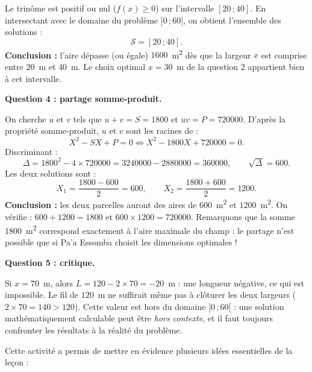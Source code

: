 \documentclass[11pt]{article}
\newcounter{popsec}
\newcounter{popsub}
\newcommand{\courssub}[1]{%
  \stepcounter{popsub}%
  \par\vspace{9pt}\noindent{\popxbold\fontsize{11.5}{13}\selectfont\color{popink}{\color{poporange}\thepopsec.\thepopsub}\hspace{6pt}#1}\par\nopagebreak\vspace{4pt}
}
\begin{document}
\begin{exoresolu}
Le trinôme est positif ou nul ($f(x) \geq 0$) sur l'intervalle $[20\,; 40]$. En intersectant avec le domaine du problème $]0\,; 60[$, on obtient l'ensemble des solutions :
\[ \mathcal{S} = [20\,; 40]. \]
\textbf{Conclusion :} l'aire dépasse (ou égale) $\num{1600}$~m\textsuperscript{2} dès que la largeur $x$ est comprise entre $20$~m et $40$~m. Le choix optimal $x = 30$~m de la question 2 appartient bien à cet intervalle.

\textbf{Question 4 : partage somme-produit.}

On cherche $u$ et $v$ tels que $u + v = S = \num{1800}$ et $uv = P = \num{720000}$. D'après la propriété somme-produit, $u$ et $v$ sont les racines de :
\[ X^2 - SX + P = 0 \iff X^2 - 1800X + 720000 = 0. \]
Discriminant :
\[ \Delta = 1800^2 - 4 \times 720000 = \num{3240000} - \num{2880000} = \num{360000}, \qquad \sqrt{\Delta} = 600. \]
Les deux solutions sont :
\[ X_1 = \frac{1800 - 600}{2} = 600, \qquad X_2 = \frac{1800 + 600}{2} = 1200. \]
\textbf{Conclusion :} les deux parcelles auront des aires de $600$~m\textsuperscript{2} et $\num{1200}$~m\textsuperscript{2}. On vérifie : $600 + 1200 = \num{1800}$ et $600 \times 1200 = \num{720000}$. Remarquons que la somme $\num{1800}$~m\textsuperscript{2} correspond exactement à l'aire maximale du champ : le partage n'est possible que si Pa'a Essomba choisit les dimensions optimales !

\textbf{Question 5 : critique.}

Si $x = 70$~m, alors $L = 120 - 2 \times 70 = -20$~m : une longueur négative, ce qui est impossible. Le fil de $120$~m ne suffirait même pas à clôturer les deux largeurs ($2 \times 70 = 140 > 120$). Cette valeur est hors du domaine $]0\,; 60[$ : une solution mathématiquement calculable peut être \emph{hors contexte}, et il faut toujours confronter les résultats à la réalité du problème.
\end{exoresolu}

\courssub{Bilan de l'activité}

Cette activité a permis de mettre en évidence plusieurs idées essentielles de la leçon :
\end{document}
